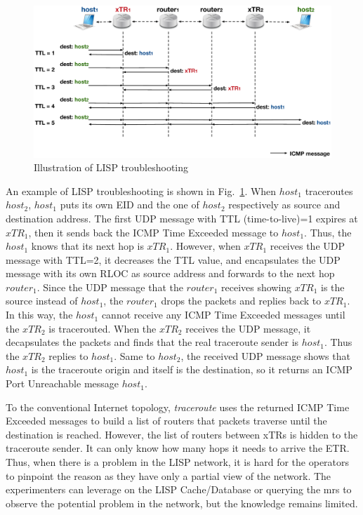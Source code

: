 \begin{figure}[!t]
	\centering
	\includegraphics[width=\textwidth]{Pics/LISP_traceroute.eps}
	\caption{Illustration of LISP troubleshooting}
	\label{Illustration_LISP_troubleshooting}
\end{figure}
An example of LISP troubleshooting is shown in Fig.~\ref{Illustration_LISP_troubleshooting}. When $host_1$ traceroutes $host_2$, $host_1$ puts its own EID and the one of $host_2$ respectively as source and destination address. The first UDP message with TTL (time-to-live)=1 expires at $xTR_1$, then it sends back the ICMP Time Exceeded message to $host_1$. Thus, the $host_1$ knows that its next hop is $xTR_1$. However, when $xTR_1$ receives the UDP message with TTL=2, it decreases the TTL value, and encapsulates the UDP message with its own RLOC as source address and forwards to the next hop $router_1$. Since the UDP message that the $router_1$ receives showing $xTR_1$ is the source instead of $host_1$, the $router_1$ drops the packets and replies back to $xTR_1$. In this way, the $host_1$ cannot receive any ICMP Time Exceeded messages until the $xTR_2$ is tracerouted. When the $xTR_2$ receives the UDP message, it decapsulates the packets and finds that the real traceroute sender is $host_1$. Thus the $xTR_2$ replies to $host_1$. Same to $host_2$, the received UDP message shows that $host_1$ is the traceroute origin and itself is the destination, so it returns an ICMP Port Unreachable message $host_1$. 

To the conventional Internet topology, \emph{traceroute} uses the returned ICMP Time Exceeded messages to build a list of routers that packets traverse until the destination is reached. However, %
the list of routers between xTRs is hidden to the traceroute sender. It can only know how many hops it needs to arrive the ETR. Thus, when there is a problem in the LISP network, it is hard for the operators to pinpoint the reason as they have only a partial view of the network. The experimenters can leverage on the LISP Cache/Database or querying the \acrshort{mr}s to observe the potential problem in the network, but the knowledge remains limited. 

